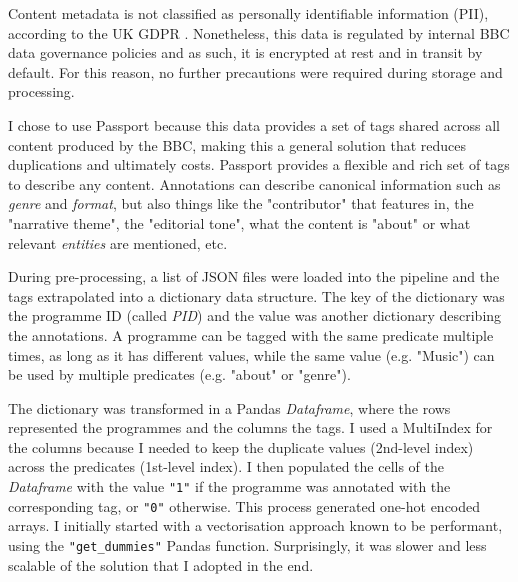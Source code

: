 
Content metadata is not classified as personally identifiable information (PII), according to the UK GDPR \cite{UKGDPR}. Nonetheless,
this data is regulated by internal BBC data governance policies and as such, it is encrypted at rest and in transit by default.
For this reason, no further precautions were required during storage and processing.


I chose to use Passport because this data provides a set of tags shared across all content produced by the BBC,
making this a general solution that reduces duplications and ultimately costs. Passport provides a flexible and rich set of tags to describe
any content. Annotations can describe canonical information such as \textit{genre} and \textit{format}, but also things like the "contributor"
that features in, the "narrative theme", the "editorial tone", what the content is "about" or what relevant \textit{entities} are mentioned, etc.


During pre-processing, a list of JSON files were loaded into the pipeline and the tags extrapolated into a dictionary data structure.
The key of the dictionary was the programme ID (called \textit{PID}) and the value was another dictionary describing the annotations.
A programme can be tagged with the same predicate multiple times,
as long as it has different values, while the same value (e.g. "Music") can be used by multiple predicates (e.g. "about" or "genre").

The dictionary was transformed in a Pandas \textit{Dataframe}, where the rows represented the programmes and the columns the tags.
I used a MultiIndex \cite{Pandas:MultiIndex} for the columns because I needed to keep the duplicate values (2nd-level index) across the predicates
(1st-level index).
I then populated the cells of the \textit{Dataframe} with the value \verb|"1"| if the programme was annotated with the corresponding tag,
or \verb|"0"| otherwise.
This process generated one-hot encoded arrays. I initially started with a vectorisation approach known to be performant,
using the \verb|"get_dummies"| Pandas function. Surprisingly, it was slower and less scalable of the solution that
I adopted in the end.

